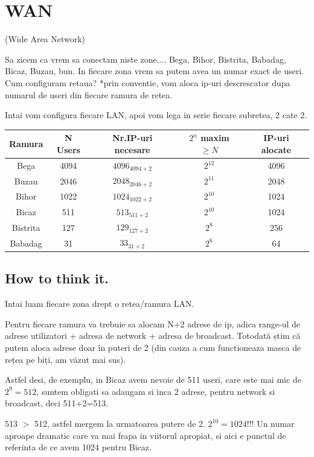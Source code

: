 \documentclass{article}
\begin{document}
\newpage
\section{WAN} (Wide Area Network)

Sa zicem ca vrem sa conectam niste zone.... Bega, Bihor, Bistrita, Babadag, Bicaz, Buzau, bun. In fiecare zona vrem sa putem avea un numar exact de useri. Cum configuram retaua?
*prin conventie, vom aloca ip-uri descrescator dupa numarul de useri din fiecare ramura de retea.


Intai vom configura fiecare LAN, apoi vom lega in serie fiecare subretea, 2 cate 2.

\begin{center}
\begin{tabular}{||c| c| c|c|c||} 
\hline 
 Ramura & N Users & Nr.IP-uri necesare & $2^{n}$ maxim $\geq N$ & IP-uri alocate \\
 \hline \hline
 Bega & 4094 & $4096_{4094+2}$ & $2^{12}$ & 4096\\   
 \hline 
 Buzau & 2046 & $2048_{2046+2}$ & $2^{11}$ & 2048\\  
 \hline 
 Bihor & 1022 & $1024_{1022+2}$ & $2^{10}$ & 1024\\  
 \hline 
 Bicaz & 511 & $513_{511+2}$ & $2^{10}$& 1024\\ 
 \hline 
 Bistrita & 127 & $129_{127+2}$ & $2^{8}$& 256\\   
 \hline
 Babadag & 31 & $33_{31+2}$ & $2^{6}$ & 64\\   
\hline \hline
\end{tabular}
\end{center}
\subsection{How to think it.}
Intai luam fiecare zona drept o retea/ramura LAN.

Pentru fiecare ramura va trebuie sa alocam N+2 adrese de ip, adica range-ul de adrese utilizatori + adresa de network + adresa de broadcast.
Totodată știm că putem aloca adrese doar în puteri de 2 (din cauza a cum functioneaza masca de rețea pe biți, am văzut mai sus).

Astfel desi, de exemplu, in Bicaz avem nevoie de 511 useri, care este mai mic de $2^{9}=512$, suntem obligati sa adaugam si inca 2 adrese, pentru network si broadcast, deci 511+2=513.


513 $>$ 512, astfel mergem la urmatoarea putere de 2. $2^{10}=1024$!!! Un numar aproape dramatic care va mai frapa in viitorul apropiat, si aici e punctul de referinta de ce avem 1024 pentru Bicaz.
\end{document}
